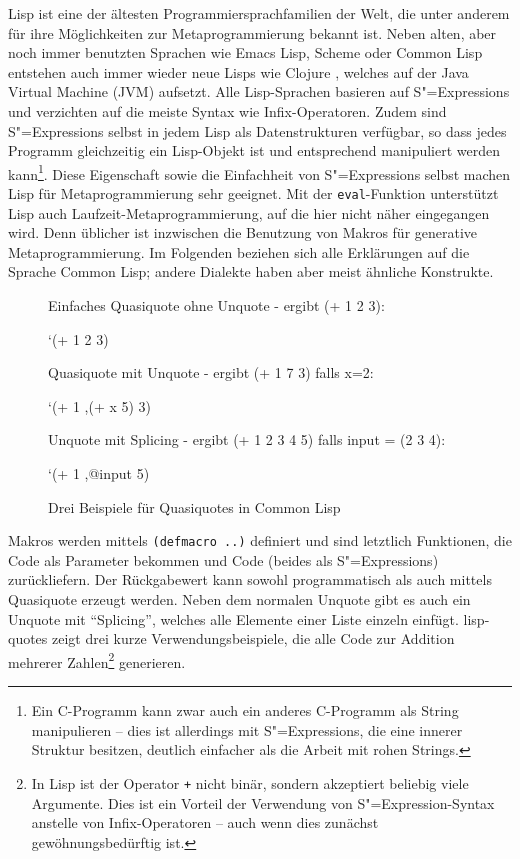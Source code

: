 \documentclass[12pt, a4paper, bibgerm]{scrbook}
\newenvironment{DIFnomarkup}{}{}
\newcommand\icode[1]{\lstinline?#1?}
\newcommand\abb{}
\newcommand{\sexp}{S"=Expression}
\newcommand{\sexps}{S"=Expressions}
\begin{document}
Lisp ist eine der ältesten Programmiersprachfamilien der Welt, die unter
anderem für ihre Möglichkeiten zur Metaprogrammierung bekannt ist. Neben
alten, aber noch immer benutzten Sprachen wie Emacs Lisp, Scheme oder
Common Lisp entstehen auch immer wieder neue Lisps wie Clojure
\cite{Clojure}, welches auf der Java Virtual Machine (JVM)
aufsetzt. Alle Lisp-Sprachen basieren auf \sexps{} und verzichten auf
die meiste Syntax wie Infix-Operatoren. Zudem sind \sexps{} selbst in
jedem Lisp als Datenstrukturen verfügbar, so dass jedes Programm
gleichzeitig ein Lisp-Objekt ist und entsprechend manipuliert werden
kann\footnote{Ein C-Programm kann zwar auch ein anderes C-Programm als
  String manipulieren -- dies ist allerdings mit \sexps{}, die eine
  innerer Struktur besitzen, deutlich einfacher als die Arbeit mit
  rohen Strings.}. Diese Eigenschaft sowie die Einfachheit von \sexps{}
selbst machen Lisp für Metaprogrammierung sehr geeignet. Mit der
\icode{eval}-Funktion unterstützt Lisp auch Laufzeit-Metaprogrammierung,
auf die hier nicht näher eingegangen wird. Denn üblicher ist inzwischen
die Benutzung von Makros für generative Metaprogrammierung. Im Folgenden
beziehen sich alle Erklärungen auf die Sprache Common Lisp; andere
Dialekte haben aber meist ähnliche Konstrukte.

\begin{figure}[h]
  \centering
  \begin{DIFnomarkup}\begin{code}
Einfaches Quasiquote ohne Unquote - ergibt (+ 1 2 3):

 `(+ 1 2 3)


Quasiquote mit Unquote - ergibt (+ 1 7 3) falls x=2:

`(+ 1 ,(+ x 5) 3)


Unquote mit Splicing - ergibt (+ 1 2 3 4 5) falls input = (2 3 4):

`(+ 1 ,@input 5)
  \end{code}\end{DIFnomarkup}
  \caption{Drei Beispiele für Quasiquotes in Common Lisp}
  \label{magicl:fig:lisp-quotes}
\end{figure}

Makros werden mittels \icode{(defmacro ..)} definiert und sind letztlich
Funktionen, die Code als Parameter bekommen und Code (beides als
\sexps{}) zurückliefern. Der Rückgabewert kann sowohl programmatisch als
auch mittels Quasiquote erzeugt werden. Neben dem normalen Unquote gibt
es auch ein Unquote mit "`Splicing"', welches alle Elemente einer Liste
einzeln einfügt. \abb{lisp-quotes} zeigt drei kurze
Verwendungsbeispiele, die alle Code zur Addition mehrerer
Zahlen\footnote{In Lisp ist der Operator \icode{+} nicht binär, sondern
  akzeptiert beliebig viele Argumente. Dies ist ein Vorteil der
  Verwendung von \sexp{}-Syntax anstelle von Infix-Operatoren -- auch
  wenn dies zunächst gewöhnungsbedürftig ist.} generieren.
\end{document}
